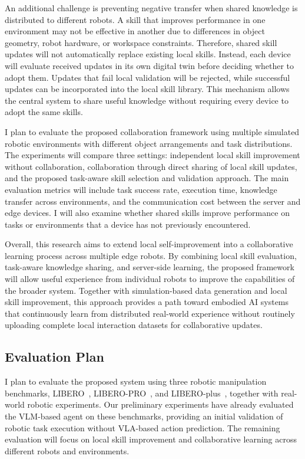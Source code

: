 \documentclass[11pt]{article}
\begin{document}
An additional challenge is preventing negative transfer when shared knowledge is distributed to different robots. A skill that improves performance in one environment may not be effective in another due to differences in object geometry, robot hardware, or workspace constraints. Therefore, shared skill updates will not automatically replace existing local skills. Instead, each device will evaluate received updates in its own digital twin before deciding whether to adopt them. Updates that fail local validation will be rejected, while successful updates can be incorporated into the local skill library. This mechanism allows the central system to share useful knowledge without requiring every device to adopt the same skills.

I plan to evaluate the proposed collaboration framework using multiple simulated robotic environments with different object arrangements and task distributions. The experiments will compare three settings: independent local skill improvement without collaboration, collaboration through direct sharing of local skill updates, and the proposed task-aware skill selection and validation approach. The main evaluation metrics will include task success rate, execution time, knowledge transfer across environments, and the communication cost between the server and edge devices. I will also examine whether shared skills improve performance on tasks or environments that a device has not previously encountered.

Overall, this research aims to extend local self-improvement into a collaborative learning process across multiple edge robots. By combining local skill evaluation, task-aware knowledge sharing, and server-side learning, the proposed framework will allow useful experience from individual robots to improve the capabilities of the broader system. Together with simulation-based data generation and local skill improvement, this approach provides a path toward embodied AI systems that continuously learn from distributed real-world experience without routinely uploading complete local interaction datasets for collaborative updates.

\subsection{Evaluation Plan}
\label{subsec:evaluation}

I plan to evaluate the proposed system using three robotic manipulation benchmarks, LIBERO~\cite{liu2023libero}, LIBERO-PRO~\cite{zhou2025liberopro}, and LIBERO-plus~\cite{fei2026liberoplus}, together with real-world robotic experiments. Our preliminary experiments have already evaluated the VLM-based agent on these benchmarks, providing an initial validation of robotic task execution without VLA-based action prediction. The remaining evaluation will focus on local skill improvement and collaborative learning across different robots and environments.
\end{document}
